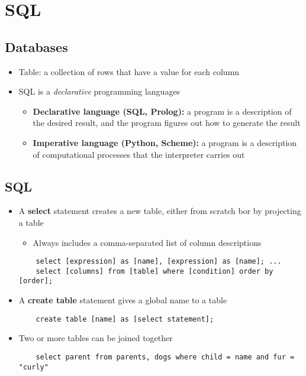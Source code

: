 \chapter{SQL}

\section{Databases}
\begin{itemize}
    \item Table: a collection of rows that have a value for each column
    \item SQL is a \emph{declarative} programming languages
    \begin{itemize}
        \item \textbf{Declarative language (SQL, Prolog):} a program is a description of the desired result, and the program figures out how to generate the result
        \item \textbf{Imperative language (Python, Scheme):} a program is a description of computational processes that the interpreter carries out
    \end{itemize}
\end{itemize}

\section{SQL}
\begin{itemize}
    \item A \textbf{select} statement creates a new table, either from scratch bor by projecting a table
    \begin{itemize}
        \item Always includes a comma-separated list of column descriptions
    \end{itemize}
    \begin{verbatim}
    select [expression] as [name], [expression] as [name]; ...
    select [columns] from [table] where [condition] order by [order];
    \end{verbatim}
    \item A \textbf{create table} statement gives a global name to a table
    \begin{verbatim}
    create table [name] as [select statement];
    \end{verbatim}
    \item Two or more tables can be joined together
    \begin{verbatim}
    select parent from parents, dogs where child = name and fur = "curly"
    \end{verbatim}
\end{itemize}

